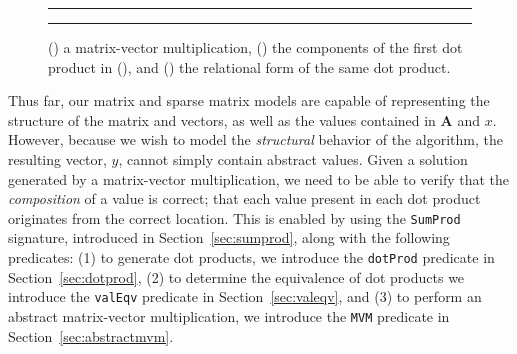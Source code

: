 \begin{figure}
\begin{subfigure}[b]{0.5\textwidth}
  \centering
  
  \caption{}
  \label{fig:mvm}
\end{subfigure}
{\color{lightgray}\rule{0.4\textwidth}{0.1pt}}
\par\bigskip
\begin{subfigure}[b]{0.5\textwidth}
  \centering
  
  \caption{}
  \label{fig:dp}
\end{subfigure}
{\color{lightgray}\rule{0.4\textwidth}{0.1pt}}
\par\bigskip
\begin{subfigure}[b]{0.5\textwidth}
  \centering
  
  \caption{}
  \label{fig:dpt}
\end{subfigure}
\caption{() a matrix-vector multiplication, () the components of the first dot product in (), and () the relational form of the same dot product.}
\end{figure}

Thus far, our matrix and sparse matrix models are capable of representing the structure of the matrix and vectors, as well as the values contained in $\bm{A}$ and $x$.  However, because we wish to model the \emph{structural} behavior of the algorithm, the resulting vector, $y$, cannot simply contain abstract values.  Given a solution generated by a matrix-vector multiplication, we need to be able to verify that the \emph{composition} of a value is correct; that each value present in each dot product originates from the correct location.
This is enabled by using the \texttt{SumProd} signature, introduced in Section~\ref{sec:sumprod}, along with the following predicates:
(1) to generate dot products, we introduce the \texttt{dotProd} predicate in Section~\ref{sec:dotprod}, (2) to determine the equivalence of dot products we introduce the \texttt{valEqv} predicate in Section~\ref{sec:valeqv}, and (3) to perform an abstract matrix-vector multiplication, we introduce the \texttt{MVM} predicate in Section~\ref{sec:abstractmvm}.

